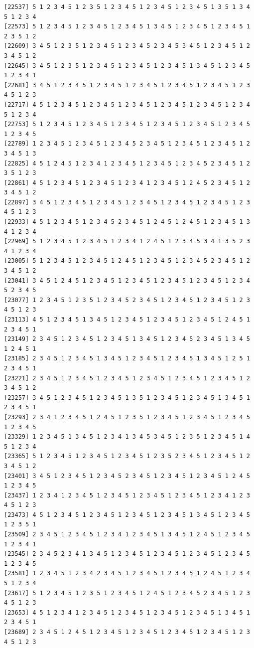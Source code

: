\documentclass[
  english,
]{book}
\begin{document}
\begin{verbatim}
[22537] 5 1 2 3 4 5 1 2 3 5 1 2 3 4 5 1 2 3 4 5 1 2 3 4 5 1 3 5 1 3 4 5 1 2 3 4
[22573] 5 1 2 3 4 5 1 2 3 4 5 1 2 3 4 5 1 3 4 5 1 2 3 4 5 1 2 3 4 5 1 2 3 5 1 2
[22609] 3 4 5 1 2 3 5 1 2 3 4 5 1 2 3 4 5 2 3 4 5 3 4 5 1 2 3 4 5 1 2 3 4 5 1 2
[22645] 3 4 5 1 2 3 5 1 2 3 4 5 1 2 3 4 5 1 2 3 4 5 1 3 4 5 1 2 3 4 5 1 2 3 4 1
[22681] 3 4 5 1 2 3 4 5 1 2 3 4 5 1 2 3 4 5 1 2 3 4 5 1 2 3 4 5 1 2 3 4 5 1 2 3
[22717] 4 5 1 2 3 4 5 1 2 3 4 5 1 2 3 4 5 1 2 3 4 5 1 2 3 4 5 1 2 3 4 5 1 2 3 4
[22753] 5 1 2 3 4 5 1 2 3 4 5 1 2 3 4 5 1 2 3 4 5 1 2 3 4 5 1 2 3 4 5 1 2 3 4 5
[22789] 1 2 3 4 5 1 2 3 4 5 1 2 3 4 5 2 3 4 5 1 2 3 4 5 1 2 3 4 5 1 2 3 4 5 1 3
[22825] 4 5 1 2 4 5 1 2 3 4 1 2 3 4 5 1 2 3 4 5 1 2 3 4 5 2 3 4 5 1 2 3 5 1 2 3
[22861] 4 5 1 2 3 4 5 1 2 3 4 5 1 2 3 4 1 2 3 4 5 1 2 4 5 2 3 4 5 1 2 3 4 5 1 2
[22897] 3 4 5 1 2 3 4 5 1 2 3 4 5 1 2 3 4 5 1 2 3 4 5 1 2 3 4 5 1 2 3 4 5 1 2 3
[22933] 4 5 1 2 3 4 5 1 2 3 4 5 2 3 4 5 1 2 4 5 1 2 4 5 1 2 3 4 5 1 3 4 1 2 3 4
[22969] 5 1 2 3 4 5 1 2 3 4 5 1 2 3 4 1 2 4 5 1 2 3 4 5 3 4 1 3 5 2 3 4 1 2 3 4
[23005] 5 1 2 3 4 5 1 2 3 4 5 1 2 4 5 1 2 3 4 5 1 2 3 4 5 2 3 4 5 1 2 3 4 5 1 2
[23041] 3 4 5 1 2 4 5 1 2 3 4 5 1 2 3 4 5 1 2 3 4 5 1 2 3 4 5 1 2 3 4 5 2 3 4 5
[23077] 1 2 3 4 5 1 2 3 5 1 2 3 4 5 2 3 4 5 1 2 3 4 5 1 2 3 4 5 1 2 3 4 5 1 2 3
[23113] 4 5 1 2 3 4 5 1 3 4 5 1 2 3 4 5 1 2 3 4 5 1 2 3 4 5 1 2 4 5 1 2 3 4 5 1
[23149] 2 3 4 5 1 2 3 4 5 1 2 3 4 5 1 3 4 5 1 2 3 4 5 2 3 4 5 1 3 4 5 1 2 4 5 1
[23185] 2 3 4 5 1 2 3 4 5 1 3 4 5 1 2 3 4 5 1 2 3 4 5 1 3 4 5 1 2 5 1 2 3 4 5 1
[23221] 2 3 4 5 1 2 3 4 5 1 2 3 4 5 1 2 3 4 5 1 2 3 4 5 1 2 3 4 5 1 2 3 4 5 1 2
[23257] 3 4 5 1 2 3 4 5 1 2 3 4 5 1 3 5 1 2 3 4 5 1 2 3 4 5 1 3 4 5 1 2 3 4 5 1
[23293] 2 3 4 1 2 3 4 5 1 2 4 5 1 2 3 5 1 2 3 4 5 1 2 3 4 5 1 2 3 4 5 1 2 3 4 5
[23329] 1 2 3 4 5 1 3 4 5 1 2 3 4 1 3 4 5 3 4 5 1 2 3 5 1 2 3 4 5 1 4 5 1 2 3 4
[23365] 5 1 2 3 4 5 1 2 3 4 5 1 2 3 4 5 1 2 3 5 2 3 4 5 1 2 3 4 5 1 2 3 4 5 1 2
[23401] 3 4 5 1 2 3 4 5 1 2 3 4 5 2 3 4 5 1 2 3 4 5 1 2 3 4 5 1 2 4 5 1 2 3 4 5
[23437] 1 2 3 4 1 2 3 4 5 1 2 3 4 5 1 2 3 4 5 1 2 3 4 5 1 2 3 4 1 2 3 4 5 1 2 3
[23473] 4 5 1 2 3 4 5 1 2 3 4 5 1 2 3 4 5 1 2 3 4 5 1 3 4 5 1 2 3 4 5 1 2 3 5 1
[23509] 2 3 4 5 1 2 3 4 5 1 2 3 4 1 2 3 4 5 1 3 4 5 1 2 4 5 1 2 3 4 5 1 2 3 4 1
[23545] 2 3 4 5 2 3 4 1 3 4 5 1 2 3 4 5 1 2 3 4 5 1 2 3 4 5 1 2 3 4 5 1 2 3 4 5
[23581] 1 2 3 4 5 1 2 3 4 2 3 4 5 1 2 3 4 5 1 2 3 4 5 1 2 4 5 1 2 3 4 5 1 2 3 4
[23617] 5 1 2 3 4 5 1 2 3 5 1 2 3 4 5 1 2 4 5 1 2 3 4 5 2 3 4 5 1 2 3 4 5 1 2 3
[23653] 4 5 1 2 3 4 1 2 3 4 5 1 2 3 4 5 1 2 3 4 5 1 2 3 4 5 1 3 4 5 1 2 3 4 5 1
[23689] 2 3 4 5 1 2 4 5 1 2 3 4 5 1 2 3 4 5 1 2 3 4 5 1 2 3 4 5 1 2 3 4 5 1 2 3

\end{verbatim}
\end{document}
